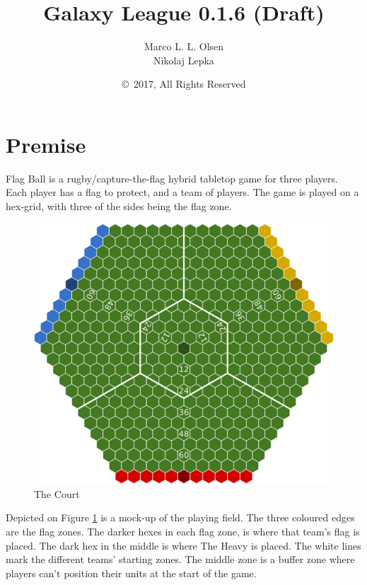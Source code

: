 \documentclass{report}
\title{Galaxy League 0.1.6 (Draft)}
\author{Marco L. L. Olsen\\ Nikolaj Lepka}
\date{\copyright\ 2017, All Rights Reserved}
\begin{document}
\maketitle

\section*{Premise}
Flag Ball is a rugby/capture-the-flag hybrid tabletop game for three players.
Each player has a flag to protect, and a team of players.
The game is played on a hex-grid, with three of the sides being the flag zone.
\begin{figure}
    \centering
    \includegraphics[width=\textwidth]{court}
    \caption{The Court}
    \label{fig:court}
\end{figure}
Depicted on Figure \ref{fig:court} is a mock-up of the playing field. The three coloured edges are the flag zones. The darker hexes in each flag zone, is where that team's flag is placed. 
The dark hex in the middle is where The Heavy is placed.
The white lines mark the different teams' starting zones. The middle zone is a buffer zone where players can’t position their units at the start of the game.

\tableofcontents





%






\end{document}
